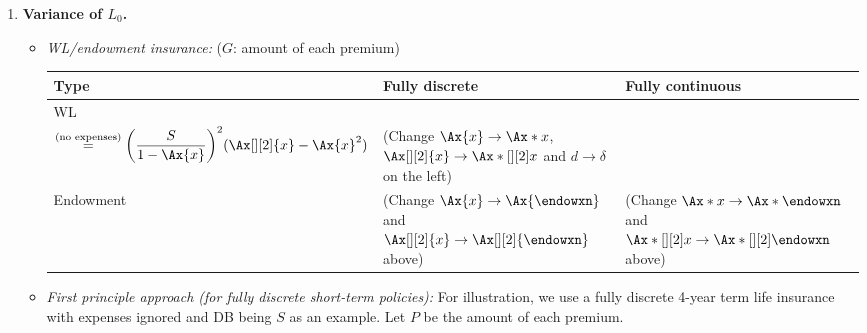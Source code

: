 \begin{enumerate}
\begin{enumerate}[label={(\arabic*)}]
\begin{itemize}
\begin{itemize}
\begin{center}
\end{center}
\end{itemize}
\end{itemize}
\end{enumerate}
\subsubsection*{Theme 2: Probabilistic quantities of loss at issue random variable}
\item \label{it:l0-var} \textbf{Variance of \(L_0\).}
\begin{itemize}
\item \emph{WL/endowment insurance:} (\(G\): amount of each premium)
\begin{center}
\begin{tabular}{llp{6cm}}
\toprule
Type&Fully discrete&Fully continuous \\
\midrule
WL&
\makecell{\(\displaystyle
\qty(S+E+\frac{G-e}{d})^{2}\underbrace{(\Ax[][2]{x}-\Ax{x}^{2})}_{\text{Variance
of insurance PVRV}}\)\\
\(\displaystyle \overset{\text{(no expenses)}}{=}
\qty(\frac{S}{1-\Ax{x}})^{2}(\Ax[][2]{x}-\Ax{x}^{2})
\)}
& (Change \(\Ax{x}\to\Ax*{x}\), \(\Ax[][2]{x}\to \Ax*[][2]{x}\) and
\(d\to\delta\) on the left)\\
\midrule
Endowment&(Change \(\Ax{x}\to\Ax{\endowxn}\) and \(\Ax[][2]{x}\to \Ax[][2]{\endowxn}\) above)&
(Change \(\Ax*{x}\to\Ax*{\endowxn}\) and \(\Ax*[][2]{x}\to \Ax*[][2]{\endowxn}\) above)
\\
\bottomrule
\end{tabular}
\end{center}
\item \emph{First principle approach (for fully discrete short-term policies):}
For illustration, we use a fully discrete 4-year term life insurance with
expenses ignored and DB being \(S\) as an example. Let \(P\) be the amount of
each premium.


\end{itemize}
\end{enumerate}
